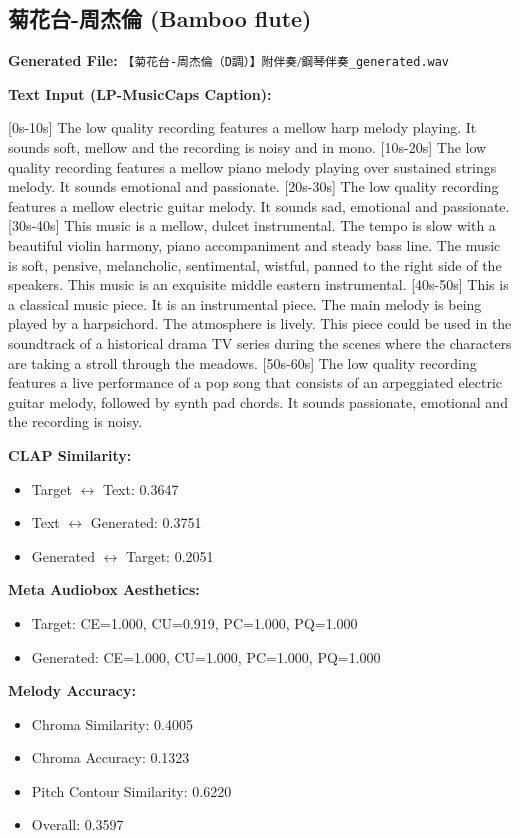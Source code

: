 \documentclass{article}
\begin{document}
\subsection{菊花台-周杰倫 (Bamboo flute)}

\textbf{Generated File:} \texttt{【菊花台-周杰倫（D調）】附伴奏⧸鋼琴伴奏\_generated.wav}

\textbf{Text Input (LP-MusicCaps Caption):}

\small
[0s-10s] The low quality recording features a mellow harp melody playing. It sounds soft, mellow and the recording is noisy and in mono. [10s-20s] The low quality recording features a mellow piano melody playing over sustained strings melody. It sounds emotional and passionate. [20s-30s] The low quality recording features a mellow electric guitar melody. It sounds sad, emotional and passionate. [30s-40s] This music is a mellow, dulcet instrumental. The tempo is slow with a beautiful violin harmony, piano accompaniment and steady bass line. The music is soft, pensive, melancholic, sentimental, wistful, panned to the right side of the speakers. This music is an exquisite middle eastern instrumental. [40s-50s] This is a classical music piece. It is an instrumental piece. The main melody is being played by a harpsichord. The atmosphere is lively. This piece could be used in the soundtrack of a historical drama TV series during the scenes where the characters are taking a stroll through the meadows. [50s-60s] The low quality recording features a live performance of a pop song that consists of an arpeggiated electric guitar melody, followed by synth pad chords. It sounds passionate, emotional and the recording is noisy.
\normalsize

\textbf{CLAP Similarity:}
\begin{itemize}
    \item Target $\leftrightarrow$ Text: 0.3647
    \item Text $\leftrightarrow$ Generated: 0.3751
    \item Generated $\leftrightarrow$ Target: 0.2051
\end{itemize}

\textbf{Meta Audiobox Aesthetics:}
\begin{itemize}
    \item Target: CE=1.000, CU=0.919, PC=1.000, PQ=1.000
    \item Generated: CE=1.000, CU=1.000, PC=1.000, PQ=1.000
\end{itemize}

\textbf{Melody Accuracy:}
\begin{itemize}
    \item Chroma Similarity: 0.4005
    \item Chroma Accuracy: 0.1323
    \item Pitch Contour Similarity: 0.6220
    \item Overall: 0.3597
\end{itemize}
\end{document}

